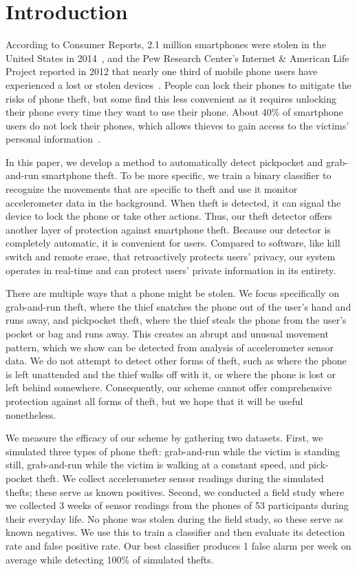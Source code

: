 \section{Introduction}

According to Consumer Reports, 2.1 million smartphones were stolen in the United States in 2014~\cite{deitrick:consumer}, and the Pew Research Center's Internet \& American Life Project reported in 2012 that nearly one third of mobile phone users have experienced a lost or stolen devices~\cite{boyles:pew}.
People can lock their phones to mitigate the risks of phone theft, but some find this less convenient as it requires unlocking their phone every time they want to use their phone.
About 40\% of smartphone users do not lock their phones, which allows thieves to gain access to the victims' personal information~\cite{egelman:lock}.

In this paper, we develop a method to automatically detect pickpocket and grab-and-run smartphone theft. To be more specific, we train a binary classifier to recognize the movements that are specific to theft and use it monitor accelerometer data in the background.
When theft is detected, it can signal the device to lock the phone or take other actions. Thus, our theft detector offers another layer of protection against smartphone theft.
Because our detector is completely automatic, it is convenient for users.
Compared to software, like kill switch and remote erase, that retroactively protects users' privacy, our system operates in real-time and can protect users' private information in its entirety.

There are multiple ways that a phone might be stolen.
We focus specifically on grab-and-run theft, where the thief snatches the phone out of the user's hand and runs away, and pickpocket theft, where the thief steals the phone from the user's pocket or bag and runs away.
This creates an abrupt and unusual movement pattern, which we show can be detected from analysis of accelerometer sensor data.
We do not attempt to detect other forms of theft, such as where the phone is left unattended and the thief walks off with it, or where the phone is lost or left behind somewhere.
Consequently, our scheme cannot offer comprehensive protection against all forms of theft, but we hope that it will be useful nonetheless.

We measure the efficacy of our scheme by gathering two datasets.
First, we simulated three types of phone theft: grab-and-run while the victim is standing still, grab-and-run while the victim is walking at a constant speed, and pick-pocket theft.
We collect accelerometer sensor readings during the simulated thefts; these serve as known positives.
Second, we conducted a field study where we collected 3 weeks of sensor readings from the phones of 53 participants during their everyday life.
No phone was stolen during the field study, so these serve as known negatives.
We use this to train a classifier and then evaluate its detection rate and false positive rate.
Our best classifier produces 1 false alarm per week on average while detecting 100\% of simulated thefts.


